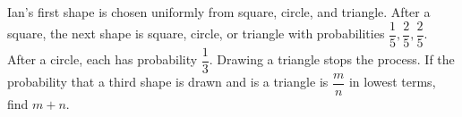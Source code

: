 Ian's first shape is chosen uniformly from square, circle, and triangle. After a square, the next shape is square, circle, or triangle with probabilities $\dfrac{1}{5},\dfrac{2}{5},\dfrac{2}{5}$. After a circle, each has probability $\dfrac{1}{3}$. Drawing a triangle stops the process. If the probability that a third shape is drawn and is a triangle is $\dfrac{m}{n}$ in lowest terms, find $m+n$.
